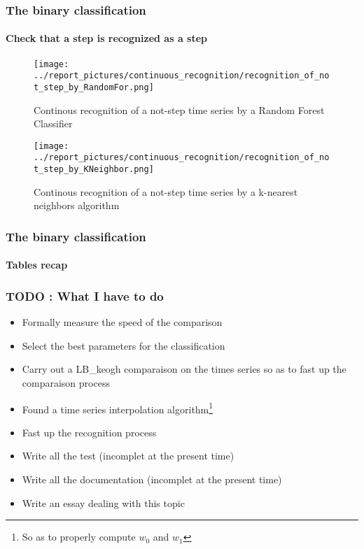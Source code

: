 \documentclass[11pt, sans]{beamer}
\begin{document}
\begin{frame}
\frametitle{The binary classification}
\framesubtitle{Check that a step is recognized as a step}

\begin{overprint}
\begin{figure}[H]
	\texttt{[image: ../report\_pictures/continuous\_recognition/recognition\_of\_not\_step\_by\_RandomFor.png]}
	\caption{Continous recognition of a not-step time series by a Random Forest Classifier}
	\label{a_not-step_is_a_step}
\end{figure}

\begin{figure}[H]
	\texttt{[image: ../report\_pictures/continuous\_recognition/recognition\_of\_not\_step\_by\_KNeighbor.png]}
	\caption{Continous recognition of a not-step time series by a k-nearest neighbors algorithm}
	\label{a_not-is_sometimes_a_step}
\end{figure}


\end{overprint}	 

\end{frame}

\begin{frame}
\frametitle{The binary classification}
\framesubtitle{Tables recap}

	

\end{frame}

\begin{frame}
	\frametitle{TODO : What I have to do}
	
	\begin{itemize}
	\item Formally measure the speed of the comparison
	\item Select the best parameters for the classification
	\item Carry out a LB\_keogh comparaison on the times series so as to fast up the comparaison process
	\item Found a time series interpolation algorithm\footnote{So as to properly compute $w_0$ and $w_1$}
	\item Fast up the recognition process
	\item Write all the test (incomplet at the present time)
	\item Write all the documentation (incomplet at the present time)
	\item Write an essay dealing with this topic
	\end{itemize}
\end{frame}	

%        
%        
\end{document}
